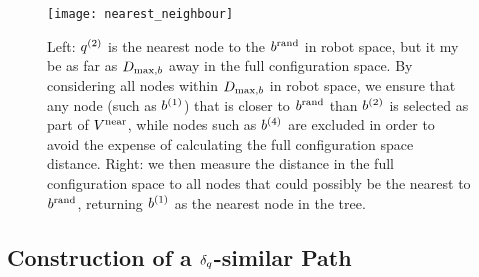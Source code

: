 \begin{figure}[h]
    \centering
    \texttt{[image: nearest\_neighbour]}
    \caption{Left: $q^{(2)}$ is the nearest node to the $b^\textrm{rand}$ in robot space, but it my be as far as $D_{\textrm{max},b}$ away in the full configuration space. By considering all nodes within $D_{\textrm{max},b}$ in robot space, we ensure that any node (such as $b^{(1)}$) that is closer to $b^\textrm{rand}$ than $b^{(2)}$ is selected as part of $V^{\textrm{near}}$, while nodes such as $b^{(4)}$ are excluded in order to avoid the expense of calculating the full configuration space distance. Right: we then measure the distance in the full configuration space to all nodes that could possibly be the nearest to $b^\textrm{rand}$, returning $b^{(1)}$ as the nearest node in the tree.}
    \label{fig:nearest}
\end{figure}



\subsection{Construction of a $\delta_q$-similar Path}
\label{sec:delta_sim_traj_construction}

